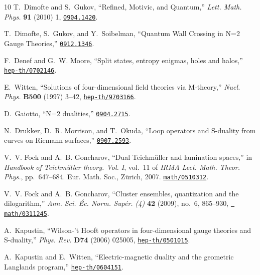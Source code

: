 \begin{thebibliography}{10}
T.~Dimofte and S.~Gukov, ``{Refined, Motivic, and Quantum},'' {\em Lett. Math.
  Phys.} {\bf 91} (2010) 1,
\href{http://www.arXiv.org/abs/0904.1420}{{\tt 0904.1420}}.

T.~Dimofte, S.~Gukov, and Y.~Soibelman, ``{Quantum Wall Crossing in N=2 Gauge
  Theories},''
\href{http://www.arXiv.org/abs/0912.1346}{{\tt 0912.1346}}.

F.~Denef and G.~W. Moore, ``Split states, entropy enigmas, holes and halos,''
\href{http://www.arXiv.org/abs/hep-th/0702146}{{\tt hep-th/0702146}}.

E.~Witten, ``Solutions of four-dimensional field theories via {M}-theory,''
  {\em Nucl. Phys.} {\bf B500} (1997) 3--42,
\href{http://www.arXiv.org/abs/hep-th/9703166}{{\tt hep-th/9703166}}.

D.~Gaiotto, ``{N=2 dualities},''
\href{http://www.arXiv.org/abs/0904.2715}{{\tt 0904.2715}}.

N.~Drukker, D.~R. Morrison, and T.~Okuda, ``{Loop operators and S-duality from
  curves on Riemann surfaces},''
\href{http://www.arXiv.org/abs/0907.2593}{{\tt 0907.2593}}.

V.~V. Fock and A.~B. Goncharov, ``Dual {T}eichm\"uller and lamination spaces,''
  in {\em Handbook of {T}eichm\"uller theory. {V}ol. {I}}, vol.~11 of {\em IRMA
  Lect. Math. Theor. Phys.}, pp.~647--684.
\newblock Eur. Math. Soc., Z\"urich, 2007.
\newblock \href{http://www.arXiv.org/abs/math/0510312}{{\tt math/0510312}}.

V.~V. Fock and A.~B. Goncharov, ``Cluster ensembles, quantization and the
  dilogarithm,'' {\em Ann. Sci. \'Ec. Norm. Sup\'er. (4)} {\bf 42} (2009),
  no.~6, 865--930, \href{http://www.arXiv.org/abs/math/0311245}{{\tt
  math/0311245}}.

A.~Kapustin, ``{Wilson-'t Hooft operators in four-dimensional gauge theories
  and S-duality},'' {\em Phys. Rev.} {\bf D74} (2006) 025005,
\href{http://www.arXiv.org/abs/hep-th/0501015}{{\tt hep-th/0501015}}.

A.~Kapustin and E.~Witten, ``{Electric-magnetic duality and the geometric
  Langlands program},''
\href{http://www.arXiv.org/abs/hep-th/0604151}{{\tt hep-th/0604151}}.


\end{thebibliography}
